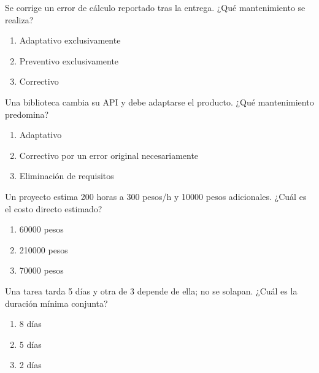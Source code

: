 \noindent\begin{minipage}{\linewidth}\setlength{\parskip}{4pt}\label{q:S-016}
Se corrige un error de cálculo reportado tras la entrega. ¿Qué mantenimiento se realiza?
\begin{enumerate}[label=\Alph*),nosep]
\item Adaptativo exclusivamente
\item Preventivo exclusivamente
\item Correctivo
\end{enumerate}\end{minipage}\par\medskip

\noindent\begin{minipage}{\linewidth}\setlength{\parskip}{4pt}\label{q:S-017}
Una biblioteca cambia su API y debe adaptarse el producto. ¿Qué mantenimiento predomina?
\begin{enumerate}[label=\Alph*),nosep]
\item Adaptativo
\item Correctivo por un error original necesariamente
\item Eliminación de requisitos
\end{enumerate}\end{minipage}\par\medskip

\noindent\begin{minipage}{\linewidth}\setlength{\parskip}{4pt}\label{q:S-018}
Un proyecto estima 200 horas a 300 pesos/h y 10000 pesos adicionales. ¿Cuál es el costo directo estimado?
\begin{enumerate}[label=\Alph*),nosep]
\item 60000 pesos
\item 210000 pesos
\item 70000 pesos
\end{enumerate}\end{minipage}\par\medskip

\noindent\begin{minipage}{\linewidth}\setlength{\parskip}{4pt}\label{q:S-019}
Una tarea tarda 5 días y otra de 3 depende de ella; no se solapan. ¿Cuál es la duración mínima conjunta?
\begin{enumerate}[label=\Alph*),nosep]
\item 8 días
\item 5 días
\item 2 días
\end{enumerate}\end{minipage}\par\medskip

